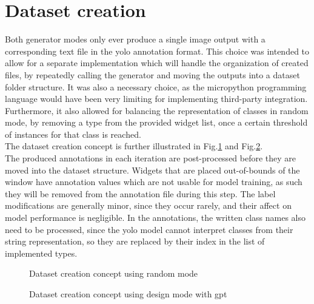 \documentclass[Bachelor, BIC, english, fhCitStyle, IEEE]{BASE/twbook} %
\begin{document}
\section{Dataset creation}
Both generator modes only ever produce a single image output with a corresponding text file in the \ac{yolo} annotation format. This choice was intended to allow for a separate implementation which will handle the organization of created files, by repeatedly calling the generator and moving the outputs into a dataset folder structure. It was also a necessary choice, as the micropython programming language would have been very limiting for implementing third-party integration.\\
Furthermore, it also allowed for balancing the representation of classes in random mode, by removing a type from the provided widget list, once a certain threshold of instances for that class is reached.\\
The dataset creation concept is further illustrated in Fig.\ref{fig:dataset-creation-random} and Fig.\ref{fig:dataset-creation-design}.\\
The produced annotations in each iteration are post-processed before they are moved into the dataset structure. Widgets that are placed out-of-bounds of the window have annotation values which are not usable for model training, as such they will be removed from the annotation file during this step. The label modifications are generally minor, since they occur rarely, and their affect on model performance is negligible. In the annotations, the written class names also need to be processed, since the \ac{yolo} model cannot interpret classes from their string representation, so they are replaced by their index in the list of implemented types.
\begin{figure}[!htbp]
    \caption{Dataset creation concept using random mode}
    \centering
    
    \label{fig:dataset-creation-random}
\end{figure}
\begin{figure}[!htbp]
    \caption{Dataset creation concept using design mode with gpt}
    \centering
    
    \label{fig:dataset-creation-design}
\end{figure}
\clearpage
\end{document}
